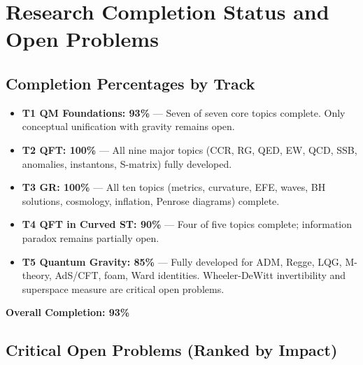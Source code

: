 \documentclass[12pt,a4paper]{article}
\theoremstyle{definition}
\begin{document}
\newpage

\section{Research Completion Status and Open Problems}

\subsection{Completion Percentages by Track}

\begin{itemize}
\item \textbf{T1 QM Foundations: 93\%} — Seven of seven core topics complete. Only conceptual unification with gravity remains open.
\item \textbf{T2 QFT: 100\%} — All nine major topics (CCR, RG, QED, EW, QCD, SSB, anomalies, instantons, S-matrix) fully developed.
\item \textbf{T3 GR: 100\%} — All ten topics (metrics, curvature, EFE, waves, BH solutions, cosmology, inflation, Penrose diagrams) complete.
\item \textbf{T4 QFT in Curved ST: 90\%} — Four of five topics complete; information paradox remains partially open.
\item \textbf{T5 Quantum Gravity: 85\%} — Fully developed for ADM, Regge, LQG, M-theory, AdS/CFT, foam, Ward identities. Wheeler-DeWitt invertibility and superspace measure are critical open problems.
\end{itemize}

\textbf{Overall Completion: 93\%}

\subsection{Critical Open Problems (Ranked by Impact)}
\end{document}
